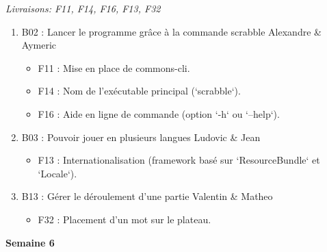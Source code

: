 \documentclass[a4paper,12pt]{article}
\begin{document}
\textit{Livraisons: F11, F14, F16, F13, F32}\newline
\begin{enumerate}
    \item B02 : Lancer le programme grâce à la commande scrabble\newline
    Alexandre \& Aymeric
    \begin{itemize}
        \item F11 : Mise en place de commons-cli.
        \item F14 : Nom de l’exécutable principal (`scrabble`).
        \item F16 : Aide en ligne de commande (option `-h` ou `--help`).
    \end{itemize}
    \item B03 : Pouvoir jouer en plusieurs langues\newline
    Ludovic \& Jean
    \begin{itemize}
        \item F13 : Internationalisation (framework basé sur `ResourceBundle` et `Locale`).
    \end{itemize}    
    \item B13 : Gérer le déroulement d’une partie\newline
    Valentin \& Matheo
        \begin{itemize}
            \item F32 : Placement d’un mot sur le plateau.\newline
        \end{itemize}
\end{enumerate}

\textbf{\large{Semaine 6}}
\end{document}
